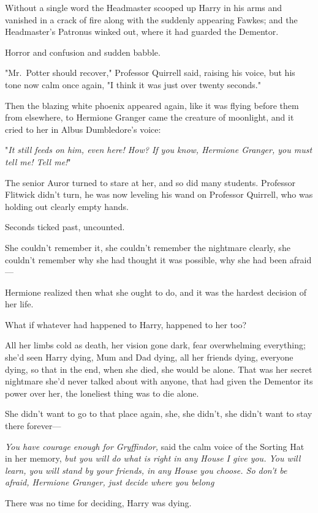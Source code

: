 Without a single word the Headmaster scooped up Harry in his arms and vanished
in a crack of fire along with the suddenly appearing Fawkes; and the
Headmaster's Patronus winked out, where it had guarded the Dementor.

Horror and confusion and sudden babble.

"Mr.~Potter should recover," Professor Quirrell said, raising his voice, but
his tone now calm once again, "I think it was just over twenty seconds."

Then the blazing white phoenix appeared again, like it was flying before them
from elsewhere, to Hermione Granger came the creature of moonlight, and it
cried to her in Albus Dumbledore's voice:

"\emph{It still feeds on him, even here! How? If you know, Hermione Granger,
you must tell me! Tell me!}"

The senior Auror turned to stare at her, and so did many students. Professor
Flitwick didn't turn, he was now leveling his wand on Professor Quirrell, who
was holding out clearly empty hands.

Seconds ticked past, uncounted.

She couldn't remember it, she couldn't remember the nightmare clearly, she
couldn't remember why she had thought it was possible, why she had been
afraid—

Hermione realized then what she ought to do, and it was the hardest decision of
her life.

What if whatever had happened to Harry, happened to her too?

All her limbs cold as death, her vision gone dark, fear overwhelming
everything; she'd seen Harry dying, Mum and Dad dying, all her friends dying,
everyone dying, so that in the end, when she died, she would be alone. That was
her secret nightmare she'd never talked about with anyone, that had given the
Dementor its power over her, the loneliest thing was to die alone.

She didn't want to go to that place again, she, she didn't, she didn't want to
stay there forever—

\emph{You have courage enough for Gryffindor,} said the calm voice of the
Sorting Hat in her memory, \emph{but you will do what is right in any House I
give you. You will learn, you will stand by your friends, in any House you
choose. So don't be afraid, Hermione Granger, just decide where you
belong{\el}}

There was no time for deciding, Harry was dying.

